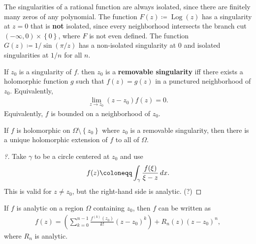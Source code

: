 \begin{example}[?]

The singularities of a rational function are always isolated, since
there are finitely many zeros of any polynomial. The function
\(F(z) \coloneqq\operatorname{Log}(z)\) has a singularity at \(z=0\)
that is \textbf{not} isolated, since every neighborhood intersects the
branch cut \((-\infty, 0) \times\left\{{ 0 }\right\}\), where \(F\) is
not even defined. The function \(G(z) \coloneqq 1/\sin(\pi/z)\) has a
non-isolated singularity at 0 and isolated singularities at \(1/n\) for
all \(n\).

\end{example}

\begin{definition}

If \(z_0\) is a singularity of \(f\). then \(z_0\) is a
\textbf{removable singularity} iff there exists a holomorphic function
\(g\) such that \(f(z) = g(z)\) in a punctured neighborhood of \(z_0\).
Equivalently,
\begin{align*}
\lim_{z\to z_0}(z-z_0) f(z) = 0
.\end{align*}
Equivalently, \(f\) is bounded on a neighborhood of \(z_0\).

\end{definition}

\begin{theorem}

If \(f\) is holomorphic on \(\Omega\setminus\left\{{z_0}\right\}\) where
\(z_0\) is a removable singularity, then there is a unique holomorphic
extension of \(f\) to all of \(\Omega\).

\end{theorem}

\begin{proof}[?]

Take \(\gamma\) to be a circle centered at \(z_0\) and use
\begin{align*}
f(z) \coloneqq\int_\gamma { f(\xi) \over \xi - z} \,dx
.\end{align*}
This is valid for \(z\neq z_0\), but the right-hand side is analytic.
(?)

\end{proof}


\begin{theorem}

If \(f\) is analytic on a region \(\Omega\) containing \(z_0\), then
\(f\) can be written as
\begin{align*}
f(z)
=\left(\sum_{k=0}^{n-1} \frac{f^{(k)}\left(z_{0}\right)}{k !}\left(z-z_{0}\right)^{k}\right)+ 
R_{n}(z)\left(z-z_{0}\right)^{n}
,\end{align*}
where \(R_n\) is analytic.

\end{theorem}

